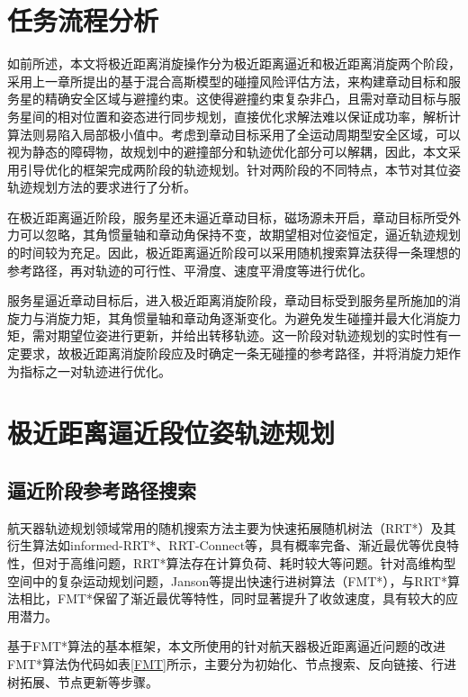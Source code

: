 \documentclass[lang=chs, degree=master, blindreview=false, winfonts=true]{yanputhesis}
\begin{document}
\section{任务流程分析}
如前所述，本文将极近距离消旋操作分为极近距离逼近和极近距离消旋两个阶段，采用上一章所提出的基于混合高斯模型的碰撞风险评估方法，来构建章动目标和服务星的精确安全区域与避撞约束。这使得避撞约束复杂非凸，且需对章动目标与服务星间的相对位置和姿态进行同步规划，直接优化求解法难以保证成功率，解析计算法则易陷入局部极小值中。考虑到章动目标采用了全运动周期型安全区域，可以视为静态的障碍物，故规划中的避撞部分和轨迹优化部分可以解耦，因此，本文采用引导优化的框架完成两阶段的轨迹规划。针对两阶段的不同特点，本节对其位姿轨迹规划方法的要求进行了分析。

在极近距离逼近阶段，服务星还未逼近章动目标，磁场源未开启，章动目标所受外力可以忽略，其角惯量轴和章动角保持不变，故期望相对位姿恒定，逼近轨迹规划的时间较为充足。因此，极近距离逼近阶段可以采用随机搜索算法获得一条理想的参考路径，再对轨迹的可行性、平滑度、速度平滑度等进行优化。

服务星逼近章动目标后，进入极近距离消旋阶段，章动目标受到服务星所施加的消旋力与消旋力矩，其角惯量轴和章动角逐渐变化。为避免发生碰撞并最大化消旋力矩，需对期望位姿进行更新，并给出转移轨迹。这一阶段对轨迹规划的实时性有一定要求，故极近距离消旋阶段应及时确定一条无碰撞的参考路径，并将消旋力矩作为指标之一对轨迹进行优化。




\section{极近距离逼近段位姿轨迹规划}
\subsection{逼近阶段参考路径搜索}
航天器轨迹规划领域常用的随机搜索方法主要为快速拓展随机树法（RRT*）及其衍生算法如informed-RRT*、RRT-Connect等，具有概率完备、渐近最优等优良特性，但对于高维问题，RRT*算法存在计算负荷、耗时较大等问题。针对高维构型空间中的复杂运动规划问题，Janson等提出快速行进树算法（FMT*）\cite{jansonFastMarchingTree2015}，与RRT*算法相比，FMT*保留了渐近最优等特性，同时显著提升了收敛速度，具有较大的应用潜力。

基于FMT*算法的基本框架，本文所使用的针对航天器极近距离逼近问题的改进FMT*算法伪代码如表\ref{FMT}所示，主要分为初始化、节点搜索、反向链接、行进树拓展、节点更新等步骤。
\end{document}

